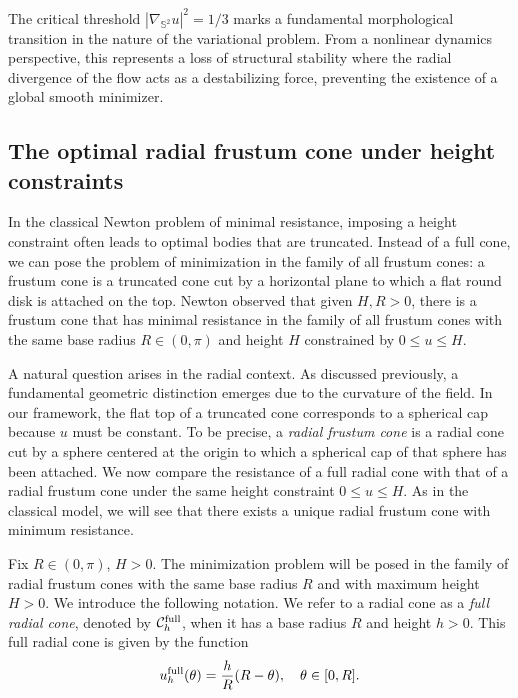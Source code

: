 \documentclass[a4paper,12pt]{amsart}
\theoremstyle{plain}
\theoremstyle{definition}
\begin{document}
 The critical threshold $|\nabla_{\mathbb{S}^2} u|^2 = 1/3$ marks a fundamental morphological transition in the nature of the variational problem. From a nonlinear dynamics perspective, this represents a loss of structural stability where the radial divergence of the flow acts as a destabilizing force, preventing the existence of a global smooth minimizer. 
   
\subsection{The optimal radial frustum cone under height constraints}
In  the classical Newton problem of minimal resistance, imposing a height constraint often leads to optimal bodies that are truncated. Instead of a full cone, we can pose the problem of minimization in the family of all frustum cones: a frustum cone is a truncated cone cut by a horizontal plane to which a flat round disk is attached on the top. Newton observed that given $H,R>0$, there is a frustum cone that has minimal resistance in the family of all frustum cones with the same base radius $R\in (0,\pi)$ and height $H$ constrained by $0\leq u\leq H$. 

A natural question arises in the radial context. As discussed previously, a fundamental geometric distinction emerges due to the curvature of the field. In our framework, the flat top of a truncated cone corresponds to a spherical cap because $u$ must be constant. To be precise, a {\it radial frustum cone} is a radial cone cut by a sphere centered at the origin to which a spherical cap of that sphere has been attached. We now compare the resistance of a full radial cone with that of a radial frustum cone under the same height constraint $0 \leq u \leq H$. As in the classical model, we will see that there exists a unique radial frustum cone with minimum resistance. 

Fix $R\in (0,\pi)$, $H>0$. The minimization problem will be posed in the family of radial frustum cones with the same base radius $R$ and with maximum height $H>0$. We introduce the following notation. We refer to a radial cone as a {\it full radial cone}, denoted by $\mathcal{C}^{\rm full}_h$, when it has a base radius $R$ and height $h>0$. This full radial cone is given by the function
$$u^{\rm full}_h(\theta) = \frac{h}{R}(R - \theta),\quad \theta \in [0, R].$$
 
\end{document}

